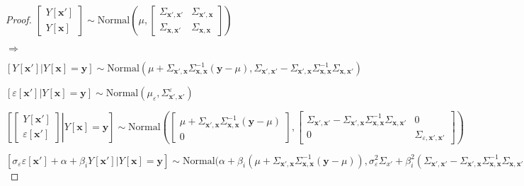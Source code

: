 \documentclass[12pt]{article}
\theoremstyle{definition}
\theoremstyle{remark}
\newcommand{\provar}{\Sigma}
\newcommand{\position}{\mathbf{x}}
\newcommand{\Signal}{Y}
\newcommand{\signal}{\mathbf{y}}
\begin{document}
\begin{proof}
$\begin{bmatrix}
\Signal[\position']\\\hline
\Signal[\position]
\end{bmatrix}\sim\mathrm{Normal}\left(\mu,\begin{bmatrix}\provar_{\position',\position'}&\provar_{\position',\position}\\
\provar_{\position,\position'}&
\provar_{\position,\position}
\end{bmatrix}\right)$

$\Rightarrow$

$\left[
\left.\Signal[\position']
\right|
\Signal[\position]=\signal
\right]\sim\mathrm{Normal}(\mu+\Sigma_{\position',\position}\Sigma_{\position,\position}^{-1} (\signal-\mu),\Sigma_{\position',\position'}-\Sigma_{\position',\position}\Sigma_{\position,\position}^{-1}\Sigma_{\position,\position'})$


$\left[\left.
\varepsilon[\position']
\right|
\Signal[\position]=\signal
\right]\sim\mathrm{Normal}(\mu_\varepsilon,\provar^\varepsilon_{\position',\position'})$



$\left[\left.\begin{bmatrix}
\Signal[\position']\\
\varepsilon[\position']
\end{bmatrix}\right|
\Signal[\position]=\signal
\right]\sim\mathrm{Normal}\left(\begin{bmatrix}\mu+\Sigma_{\position',\position}\Sigma_{\position,\position}^{-1} (\signal-\mu)\\\hline0\end{bmatrix},
\begin{bmatrix}\Sigma_{\position',\position'}-\Sigma_{\position',\position}\Sigma_{\position,\position}^{-1}\Sigma_{\position,\position'}&0\\0&\provar_{\varepsilon,\position',\position'}\end{bmatrix}\right)$





$\left[\sigma_\varepsilon
\varepsilon[\position']+\alpha+\beta_i
\Signal[\position']|
\Signal[\position]=\signal\right]
\sim\mathrm{Normal}(\alpha+\beta_i(\mu+\Sigma_{\position',\position}\Sigma_{\position,\position}^{-1} (\signal-\mu)),
\sigma_\varepsilon^2\provar_{x'}+\beta_i^2\left(\provar_{\position',\position'}-\provar_{\position',\position}\provar_{\position,\position}^{-1}\provar_{\position,\position'})\right)$

\end{proof}
\end{document}
